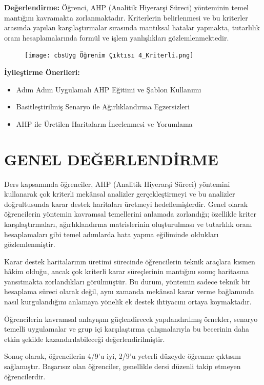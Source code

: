 \documentclass[12pt,a4paper]{article}
\begin{document}
\vspace{0.5cm}
\textbf{Değerlendirme:}
Öğrenci, AHP (Analitik Hiyerarşi Süreci) yönteminin temel mantığını kavramakta zorlanmaktadır. Kriterlerin belirlenmesi ve bu kriterler arasında yapılan karşılaştırmalar sırasında mantıksal hatalar yapmakta, tutarlılık oranı hesaplamalarında formül ve işlem yanlışlıkları gözlemlenmektedir.
\begin{figure}[H]
 \centering
 \texttt{[image: cbsUyg Öğrenim Çıktısı 4\_Kriterli.png]} %
\end{figure}

\textbf{İyileştirme Önerileri:}
\begin{itemize}
    \item Adım Adım Uygulamalı AHP Eğitimi ve Şablon Kullanımı
    \item Basitleştirilmiş Senaryo ile Ağırlıklandırma Egzersizleri
    \item AHP ile Üretilen Haritaların İncelenmesi ve Yorumlama
\end{itemize}

\newpage

\section*{GENEL DEĞERLENDİRME}
Ders kapsamında öğrenciler, AHP (Analitik Hiyerarşi Süreci) yöntemini kullanarak çok kriterli mekânsal analizler gerçekleştirmeyi ve bu analizler doğrultusunda karar destek haritaları üretmeyi hedeflemişlerdir. Genel olarak öğrencilerin yöntemin kavramsal temellerini anlamada zorlandığı; özellikle kriter karşılaştırmaları, ağırlıklandırma matrislerinin oluşturulması ve tutarlılık oranı hesaplamaları gibi temel adımlarda hata yapma eğiliminde oldukları gözlemlenmiştir.

Karar destek haritalarının üretimi sürecinde öğrencilerin teknik araçlara kısmen hâkim olduğu, ancak çok kriterli karar süreçlerinin mantığını sonuç haritasına yansıtmakta zorlandıkları görülmüştür. Bu durum, yöntemin sadece teknik bir hesaplama süreci olarak değil, aynı zamanda mekânsal karar verme bağlamında nasıl kurgulandığını anlamaya yönelik ek destek ihtiyacını ortaya koymaktadır.

Öğrencilerin kavramsal anlayışını güçlendirecek yapılandırılmış örnekler, senaryo temelli uygulamalar ve grup içi karşılaştırma çalışmalarıyla bu becerinin daha etkin şekilde kazandırılabileceği değerlendirilmiştir.

Sonuç olarak, öğrencilerin 4/9'u iyi, 2/9'u yeterli düzeyde öğrenme çıktısını sağlamıştır. Başarısız olan öğrenciler, genellikle dersi düzenli takip etmeyen öğrencilerdir.
\end{document}
